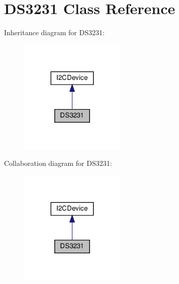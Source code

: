 \hypertarget{classDS3231}{}\section{D\+S3231 Class Reference}
\label{classDS3231}


Inheritance diagram for D\+S3231\+:
\nopagebreak
\begin{figure}[H]
\begin{center}
\leavevmode
\includegraphics[width=143pt]{classDS3231__inherit__graph}
\end{center}
\end{figure}


Collaboration diagram for D\+S3231\+:
\nopagebreak
\begin{figure}[H]
\begin{center}
\leavevmode
\includegraphics[width=143pt]{classDS3231__coll__graph}
\end{center}
\end{figure}
